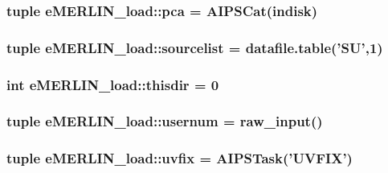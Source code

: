 \hypertarget{namespacee_m_e_r_l_i_n__load_a12b9c10fdf4743e6e2ab77e841c2ac98}{
\subsubsection[{pca}]{\setlength{\rightskip}{0pt plus 5cm}tuple {\bf e\-M\-E\-R\-L\-I\-N\-\_\-load\-::pca} = \-A\-I\-P\-S\-Cat({\bf indisk})}}\label{namespacee_m_e_r_l_i_n__load_a12b9c10fdf4743e6e2ab77e841c2ac98}
\hypertarget{namespacee_m_e_r_l_i_n__load_adf6335ce381e849e02416199918a86d0}{
\subsubsection[{sourcelist}]{\setlength{\rightskip}{0pt plus 5cm}tuple {\bf e\-M\-E\-R\-L\-I\-N\-\_\-load\-::sourcelist} = datafile.\-table('\-S\-U',1)}}\label{namespacee_m_e_r_l_i_n__load_adf6335ce381e849e02416199918a86d0}
\hypertarget{namespacee_m_e_r_l_i_n__load_a9071ee4536dd6e3909ef0590d4e0620c}{
\subsubsection[{thisdir}]{\setlength{\rightskip}{0pt plus 5cm}int {\bf e\-M\-E\-R\-L\-I\-N\-\_\-load\-::thisdir} = 0}}\label{namespacee_m_e_r_l_i_n__load_a9071ee4536dd6e3909ef0590d4e0620c}
\hypertarget{namespacee_m_e_r_l_i_n__load_af02bbee7ea129998a2af5726d1838d88}{
\subsubsection[{usernum}]{\setlength{\rightskip}{0pt plus 5cm}tuple {\bf e\-M\-E\-R\-L\-I\-N\-\_\-load\-::usernum} = raw\-\_\-input()}}\label{namespacee_m_e_r_l_i_n__load_af02bbee7ea129998a2af5726d1838d88}
\hypertarget{namespacee_m_e_r_l_i_n__load_a091bef4aa50a0022baf52ba2ecad1fa6}{
\subsubsection[{uvfix}]{\setlength{\rightskip}{0pt plus 5cm}tuple {\bf e\-M\-E\-R\-L\-I\-N\-\_\-load\-::uvfix} = \-A\-I\-P\-S\-Task('\-U\-V\-F\-I\-X')}}\label{namespacee_m_e_r_l_i_n__load_a091bef4aa50a0022baf52ba2ecad1fa6}
